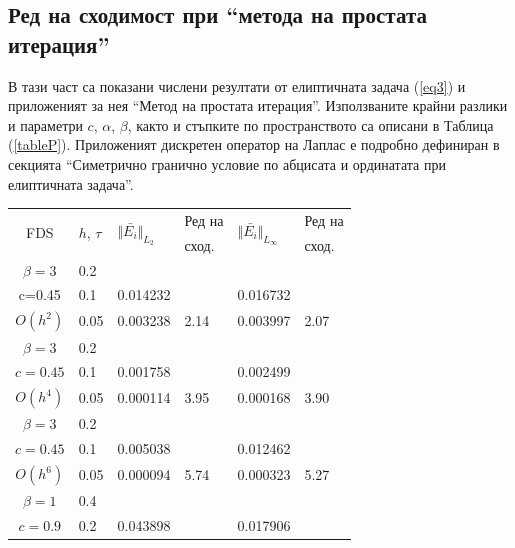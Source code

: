 \documentclass{article}
\newcommand{\rf}[1]{(\ref{#1})}
\begin{document}
\subsection{Ред на сходимост при ``метода на простата итерация''}\label{validation}
В тази част са показани числени резултати от елиптичната задача \rf{eq3} и приложеният за нея ``Метод на простата итерация''. Използваните крайни разлики и параметри $c$, $\alpha$, $\beta$, както и стъпките по пространството са описани в Таблица \rf{tableP}. Приложеният дискретен оператор на Лаплас е подробно дефиниран в секцията ``Симетрично гранично условие по абцисата и ординатата при елиптичната задача''.

\begin{table}[ht]
\centering
		\begin{tabular}{||c|l|ll|ll||}
			\hline
			\hline
      \multirow{2  }{*}{FDS}        & \multirow{2  }{*}{$h$, $\tau$}  &  	\multirow{2  }{*}{ $\Vert \bar{ E_i} \Vert_{L_2}$ }	&Ред на	& \multirow{2  }{*}{ $\Vert \bar{ E_i} \Vert_{L_\infty}$ } 		&Ред на   \\
	                                        &                                                & 							 					&  сход. 	& 								       					& сход. \\
   					\hline 
					\hline 
$\beta = 3$   	&0.2    										&            &            &           &   \\
      c=0.45 	&0.1    & 0.014232  						&            & 0.016732 			&   \\
   $O(h^2)$     &0.05   & 0.003238  						&2.14  & 0.003997					& 2.07 \\
\hline 
$\beta = 3$   	&0.2   &            &            &             &    \\
      $c=0.45 $ &0.1   &   0.001758   &           &  0.002499  &   \\
       $O(h^4)$	&0.05  &  0.000114 & 3.95    & 0.000168  & 3.90  \\
\hline
$\beta = 3$   	&0.2   &            &        &                  &      \\
   $c=0.45$   	&0.1   &  0.005038 &           & 0.012462       &       \\
     $O(h^6)$	&0.05  &  0.000094  & 5.74  &  0.000323 & 5.27         \\
			\hline
			\hline 	
$\beta = 1$   	&0.4   &             &           &                & \\
     $c=0.9$     &0.2   &  0.043898  &             & 0.017906      &    \\

\end{tabular}
\end{table}
\end{document}
